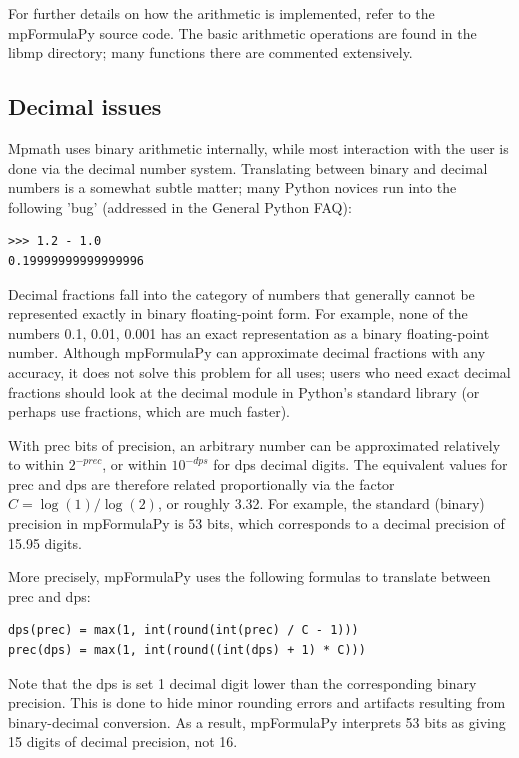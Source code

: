 \vpara
For further details on how the arithmetic is implemented, refer to the mpFormulaPy source code. The basic arithmetic operations are found in the libmp directory; many functions there are commented extensively.






\subsection{Decimal issues}

Mpmath uses binary arithmetic internally, while most interaction with the user is done via the decimal number system. Translating between binary and decimal numbers is a somewhat subtle matter; many Python novices run into the following 'bug' (addressed in the General
Python FAQ):

\begin{lstlisting}
>>> 1.2 - 1.0
0.19999999999999996
\end{lstlisting}


Decimal fractions fall into the category of numbers that generally cannot be represented exactly in binary floating-point form. For example, none of the numbers 0.1, 0.01, 0.001 has an exact representation as a binary floating-point number. Although mpFormulaPy can
approximate decimal fractions with any accuracy, it does not solve this problem for all uses; users who need exact decimal fractions should look at the decimal module in Python's standard library (or perhaps use fractions, which are much faster).

\vpara
With prec bits of precision, an arbitrary number can be approximated relatively to within $2^{-prec}$, or within $10^{-dps}$ for dps decimal digits. The equivalent values for prec and dps are therefore related proportionally via the factor $C=\log(1)/\log(2)$, or roughly 3.32. For
example, the standard (binary) precision in mpFormulaPy is 53 bits, which corresponds to a decimal precision of 15.95 digits.

\vpara
More precisely, mpFormulaPy uses the following formulas to translate between prec and dps:

\begin{lstlisting}
dps(prec) = max(1, int(round(int(prec) / C - 1)))
prec(dps) = max(1, int(round((int(dps) + 1) * C)))
\end{lstlisting}

Note that the dps is set 1 decimal digit lower than the corresponding binary precision. This is done to hide minor rounding errors and artifacts resulting from binary-decimal conversion.
As a result, mpFormulaPy interprets 53 bits as giving 15 digits of decimal precision, not 16.

